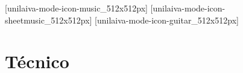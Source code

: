 
\newcommand{\subbooktitle}{Hinos Variados}





              [unilaiva-mode-icon-music_512x512px]%
              [unilaiva-mode-icon-sheetmusic_512x512px]%
              [unilaiva-mode-icon-guitar_512x512px]
  \imprintpage

  \toc

  \setcounter{chapter}{0}

    \begin{songs}{}
      
    \end{songs}

    \begin{songs}{}
      
    \end{songs}

    \begin{songs}{}
      
    \end{songs}

  \appendix

  \ifchorded
    \chapter{Técnico}
      
  \fi


